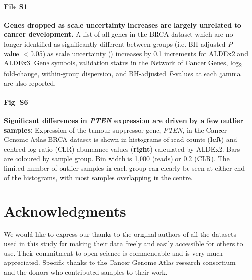 \documentclass[10pt,letterpaper]{article}
\begin{document}
\paragraph*{File S1}
\label{file:supFileDroppedGenes}
\textbf{Genes dropped as scale uncertainty increases are largely unrelated to cancer development.} A list of all genes in the BRCA dataset which are no longer identified as significantly different between groups (i.e. BH-adjusted \textit{P}-value $<$0.05) as scale uncertainty (\textgamma) increases by 0.1 increments for ALDEx2 and ALDEx3. Gene symbols, validation status in the Network of Cancer Genes, log\textsubscript{2} fold-change, within-group dispersion, and BH-adjusted \textit{P}-values at each gamma are also reported.

\paragraph*{Fig. S6}
\label{fig:supFigPTEN}
\textbf{Significant differences in \textit{PTEN} expression are driven by a few outlier samples:} Expression of the tumour suppressor gene, \textit{PTEN}, in the Cancer Genome Atlas BRCA dataset is shown in histograms of read counts (\textbf{left}) and centred log-ratio (CLR) abundance values (\textbf{right}) calculated by ALDEx2. Bars are coloured by sample group. Bin width is 1,000 (reads) or 0.2 (CLR). The limited number of outlier samples in each group can clearly be seen at either end of the histograms, with most samples overlapping in the centre.



\section*{Acknowledgments}
We would like to express our thanks to the original authors of all the datasets used in this study for making their data freely and easily accessible for others to use. Their commitment to open science is commendable and is very much appreciated. Specific thanks to the Cancer Genome Atlas research consortium and the donors who contributed samples to their work.

\nolinenumbers

%
%


\end{document}
